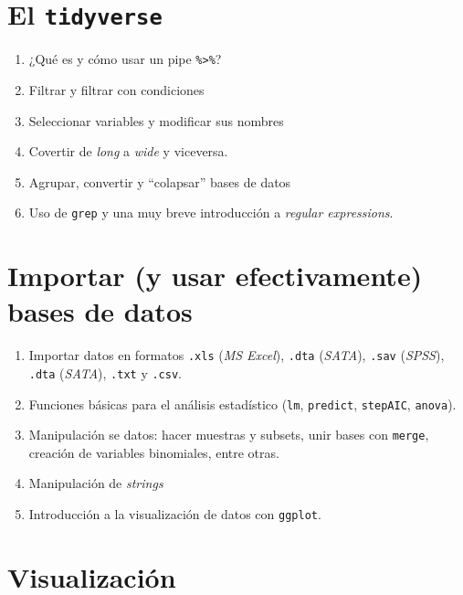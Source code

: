 \documentclass[]{article}
\providecommand{\tightlist}{%
  \setlength{\itemsep}{0pt}\setlength{\parskip}{0pt}}
\begin{document}
\section{\texorpdfstring{El
\texttt{tidyverse}}{El tidyverse}}\label{el-tidyverse}

\begin{enumerate}
\def\labelenumi{\arabic{enumi}.}
\tightlist
\item
  ¿Qué es y cómo usar un pipe \texttt{\%\textgreater{}\%}?
\item
  Filtrar y filtrar con condiciones
\item
  Seleccionar variables y modificar sus nombres
\item
  Covertir de \emph{long} a \emph{wide} y viceversa.
\item
  Agrupar, convertir y ``colapsar'' bases de datos
\item
  Uso de \texttt{grep} y una muy breve introducción a \emph{regular
  expressions}.
\end{enumerate}

\section{Importar (y usar efectivamente) bases de
datos}\label{importar-y-usar-efectivamente-bases-de-datos}

\begin{enumerate}
\def\labelenumi{\arabic{enumi}.}
\tightlist
\item
  Importar datos en formatos \texttt{.xls} (\emph{MS Excel}),
  \texttt{.dta} (\emph{SATA}), \texttt{.sav} (\emph{SPSS}),
  \texttt{.dta} (\emph{SATA}), \texttt{.txt} y \texttt{.csv}.
\item
  Funciones básicas para el análisis estadístico (\texttt{lm},
  \texttt{predict}, \texttt{stepAIC}, \texttt{anova}).
\item
  Manipulación se datos: hacer muestras y subsets, unir bases con
  \texttt{merge}, creación de variables binomiales, entre otras.
\item
  Manipulación de \emph{strings}
\item
  Introducción a la visualización de datos con \texttt{ggplot}.
\end{enumerate}

\section{Visualización}\label{visualizacion}
\end{document}
